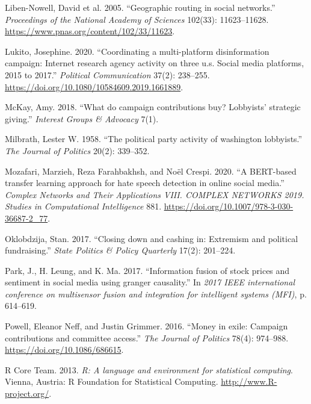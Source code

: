 \documentclass[12pt,]{article}
\begin{document}
\begin{CSLReferences}{1}{0}
\leavevmode{}%
Liben-Nowell, David et al. 2005. {``Geographic routing in social
networks.''} \emph{Proceedings of the National Academy of Sciences}
102(33): 11623--11628. \url{https://www.pnas.org/content/102/33/11623}.

\leavevmode{}%
Lukito, Josephine. 2020. {``Coordinating a multi-platform disinformation
campaign: Internet research agency activity on three u.s. Social media
platforms, 2015 to 2017.''} \emph{Political Communication} 37(2):
238--255. \url{https://doi.org/10.1080/10584609.2019.1661889}.

\leavevmode{}%
McKay, Amy. 2018. {``What do campaign contributions buy? Lobbyists'
strategic giving.''} \emph{Interest Groups \& Advocacy} 7(1).

\leavevmode{}%
Milbrath, Lester W. 1958. {``The political party activity of washington
lobbyists.''} \emph{The Journal of Politics} 20(2): 339--352.

\leavevmode{}%
Mozafari, Marzieh, Reza Farahbakhsh, and Noël Crespi. 2020. {``A
BERT-based transfer learning approach for hate speech detection in
online social media.''} \emph{Complex Networks and Their Applications
VIII. COMPLEX NETWORKS 2019. Studies in Computational Intelligence} 881.
\url{https://doi.org/10.1007/978-3-030-36687-2_77}.

\leavevmode{}%
Oklobdzija, Stan. 2017. {``Closing down and cashing in: Extremism and
political fundraising.''} \emph{State Politics \& Policy Quarterly}
17(2): 201--224.

\leavevmode{}%
Park, J., H. Leung, and K. Ma. 2017. {``Information fusion of stock
prices and sentiment in social media using granger causality.''} In
\emph{2017 IEEE international conference on multisensor fusion and
integration for intelligent systems (MFI)}, p. 614--619.

\leavevmode{}%
Powell, Eleanor Neff, and Justin Grimmer. 2016. {``Money in exile:
Campaign contributions and committee access.''} \emph{The Journal of
Politics} 78(4): 974--988. \url{https://doi.org/10.1086/686615}.

\leavevmode{}%
R Core Team. 2013. \emph{R: A language and environment for statistical
computing}. Vienna, Austria: R Foundation for Statistical Computing.
\url{http://www.R-project.org/}.


\end{CSLReferences}
\end{document}
